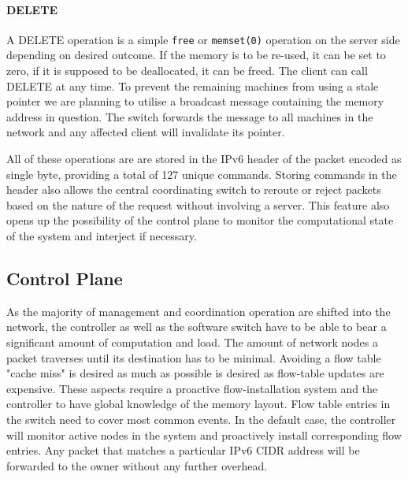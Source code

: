 \paragraph{\textbf{DELETE}}
A DELETE operation is a simple \texttt{free} or \texttt{memset(0)} operation on the server side depending on desired outcome. If the memory is to be re-used, it can be set to zero, if it is supposed to be deallocated, it can be freed. The client can call DELETE at any time. To prevent the remaining machines from using a stale pointer we are planning to utilise a broadcast message containing the memory address in question. The switch forwards the message to all machines in the network and any affected client will invalidate its pointer.


All of these operations are are stored in the IPv6 header of the packet encoded as single byte, providing a total of 127 unique commands. Storing commands in the header also allows the central coordinating switch to reroute or reject packets based on the nature of the request without involving a server. This feature also opens up the possibility of the control plane to monitor the computational state of the system and interject if necessary.

\subsection{Control Plane}
As the majority of management and coordination operation are shifted into the network, the controller as well as the software switch have to be able to bear a significant amount of computation and load.
The amount of network nodes a packet traverses until its destination has to be minimal. Avoiding a flow table "cache miss" is desired as much as possible is desired as flow-table updates are expensive. These aspects require a proactive flow-installation system and the controller to have global knowledge of the memory layout. Flow table entries in the switch need to cover most common events.
In the default case, the controller will monitor active nodes in the system and proactively install corresponding flow entries. Any packet that matches a particular IPv6 CIDR address will be forwarded to the owner without any further overhead.
